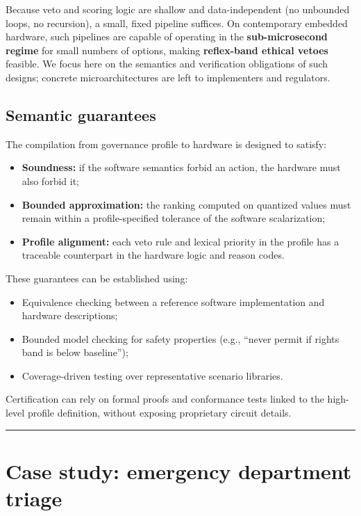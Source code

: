 \documentclass[11pt]{article}
\begin{document}
Because veto and scoring logic are shallow and data-independent (no unbounded loops, no recursion), a small, fixed pipeline suffices. On contemporary embedded hardware, such pipelines are capable of operating in the \textbf{sub-microsecond regime} for small numbers of options, making \textbf{reflex-band ethical vetoes} feasible. We focus here on the semantics and verification obligations of such designs; concrete microarchitectures are left to implementers and regulators.

\subsection{Semantic guarantees}

The compilation from governance profile to hardware is designed to satisfy:

\begin{itemize}
  \item \textbf{Soundness:} if the software semantics forbid an action, the hardware must also forbid it;
  \item \textbf{Bounded approximation:} the ranking computed on quantized values must remain within a profile-specified tolerance of the software scalarization;
  \item \textbf{Profile alignment:} each veto rule and lexical priority in the profile has a traceable counterpart in the hardware logic and reason codes.
\end{itemize}

These guarantees can be established using:

\begin{itemize}
  \item Equivalence checking between a reference software implementation and hardware descriptions;
  \item Bounded model checking for safety properties (e.g., ``never permit if rights band is below baseline'');
  \item Coverage-driven testing over representative scenario libraries.
\end{itemize}

Certification can rely on formal proofs and conformance tests linked to the high-level profile definition, without exposing proprietary circuit details.

\hrule
\vspace{1em}

\section{Case study: emergency department triage}
\end{document}
